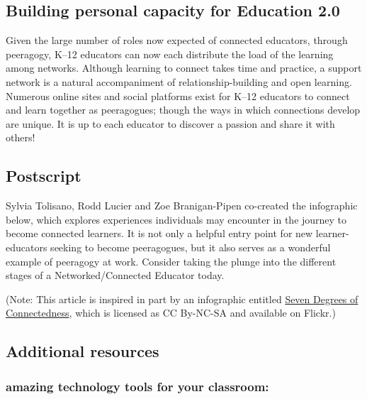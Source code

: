 \subsection{Building personal capacity for Education 2.0}

Given the large number of roles now expected of connected educators,
through peeragogy, K--12 educators can now each distribute the load of
the learning among networks. Although learning to connect takes time and
practice, a support network is a natural accompaniment of
relationship-building and open learning. Numerous online sites and
social platforms exist for K--12 educators to connect and learn together
as peeragogues; though the ways in which connections develop are unique.
It is up to each educator to discover a passion and share it with
others!

\subsection{Postscript}

Sylvia Tolisano, Rodd Lucier and Zoe Branigan-Pipen co-created the
infographic below, which explores experiences individuals may
encounter in the journey to become connected learners. It is not only
a helpful entry point for new learner-educators seeking to become
peeragogues, but it also serves as a wonderful example of peeragogy at
work.  Consider taking the plunge into the different stages of a
Networked/Connected Educator today.

(Note: This article is inspired in part by an infographic entitled
\href{http://www.flickr.com/photos/thecleversheep/7161689001/sizes/l/in/photostream/}{Seven Degrees of Connectedness}, which is licensed as CC By-NC-SA and available on Flickr.)

\subsection{Additional resources}

\subsubsection{amazing technology tools for your classroom:}

